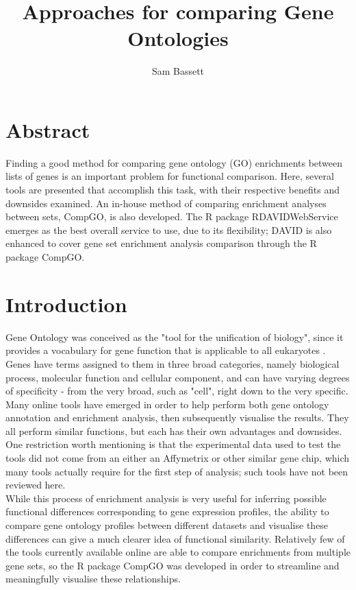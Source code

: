 \documentclass[11pt, oneside]{article}
\title{Approaches for comparing Gene Ontologies}
\author{Sam Bassett}
\affil{Developmental and Stem Cell Biology Lab,\\Victor Chang Cardiac Research Institute,\\Darlinghurst, Sydney, Australia}
\date{}
\begin{document}
\maketitle
\section*{Abstract}
Finding a good method for comparing gene ontology (GO) enrichments between lists of genes is an important problem for functional comparison. Here, several tools are presented that accomplish this task, with their respective benefits and downsides examined. An in-house method of comparing enrichment analyses between sets, CompGO, is also developed. The R package RDAVIDWebService emerges as the best overall service to use, due to its flexibility; DAVID is also enhanced to cover gene set enrichment analysis comparison through the R package CompGO.
\section*{Introduction}
Gene Ontology was conceived as the "tool for the unification of biology", since it provides a vocabulary for gene function that is applicable to all eukaryotes \cite{GOConsort00}. Genes have terms assigned to them in three broad categories, namely biological process, molecular function and cellular component, and can have varying degrees of specificity - from the very broad, such as "cell", right down to the very specific.\\
Many online tools have emerged in order to help perform both gene ontology annotation and enrichment analysis, then subsequently visualise the results. They all perform similar functions, but each has their own advantages and downsides. One restriction worth mentioning is that the experimental data used to test the tools did not come from an either an Affymetrix or other similar gene chip, which many tools actually require for the first step of analysis; such tools have not been reviewed here.\\
While this process of enrichment analysis is very useful for inferring possible functional differences corresponding to gene expression profiles, the ability to compare gene ontology profiles between different datasets and visualise these differences can give a much clearer idea of functional similarity. Relatively few of the tools currently available online are able to compare enrichments from multiple gene sets, so the R package CompGO was developed in order to streamline and meaningfully visualise these relationships. 
\end{document}
